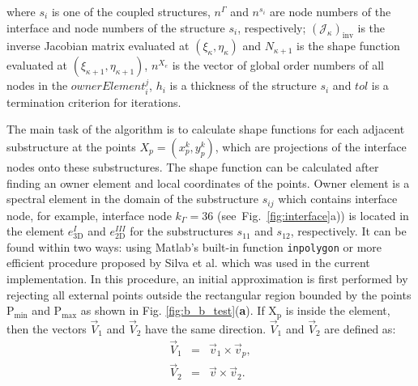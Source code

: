%
%
%
where \(s_i\) is one of the coupled structures, \(n^{\Gamma}\) and \(n^{s_i}\) are node numbers of the interface and node numbers of the structure \(s_i\), respectively; \(\left(\mathcal{J}_{\kappa}\right)_{\mathrm{inv}}\) is the inverse Jacobian matrix evaluated at \((\xi_{\kappa},\eta_{\kappa})\) and \(N_{\kappa+1}\) is the shape function evaluated at \((\xi_{\kappa+1},\eta_{\kappa+1})\), \(n^{X_e}\) is the vector of global order numbers of all nodes in the \(ownerElement^j_i\), \(h_i\) is a thickness of the structure \(s_i\) and \(tol\) is a termination criterion for iterations.

The main task of the algorithm is to calculate shape functions for each adjacent substructure at the points \(X_p=(x_p^k,y_p^k)\), which are projections of the interface nodes onto these substructures.
The shape function can be calculated after finding an owner element and local coordinates of the points.
Owner element is a spectral element in the domain of the substructure \(s_{ij}\) which contains interface node, for example, interface node \(k_\Gamma=36\) (see~Fig.~\ref{fig:interface}a)) is located in the element \(e^{I}_{3\mathrm{D}}\) and \(e^{III}_{2\mathrm{D}}\) for the substructures \(s_{11}\) and \(s_{12}\), respectively.
It can be found within two ways: using Matlab's built-in function \verb+inpolygon+ or more efficient procedure proposed by Silva et al. \cite{silva2009exact} which was used in the current implementation.
In this procedure, an initial approximation is first performed by rejecting all external points outside the rectangular region bounded by the points \(\mathrm{P_{min}}\) and \(\mathrm{P_{max}}\) as shown in Fig. \ref{fig:b_b_test}(\textbf{a}).
If \(\mathrm{X_p}\) is inside the element, then the vectors \(\vec{V}_1\) and \(\vec{V}_2\) have the same direction.
\(\vec{V}_1\) and \(\vec{V}_2\) are defined as:
\begin{eqnarray}
	\vec{V}_1 & = & \vec{v}_1\times \vec{v}_p,\\
	\vec{V}_2 & = & \vec{v}\times \vec{v}_2.
\label{eq:v_vectors}
\end{eqnarray}
%
%
%

